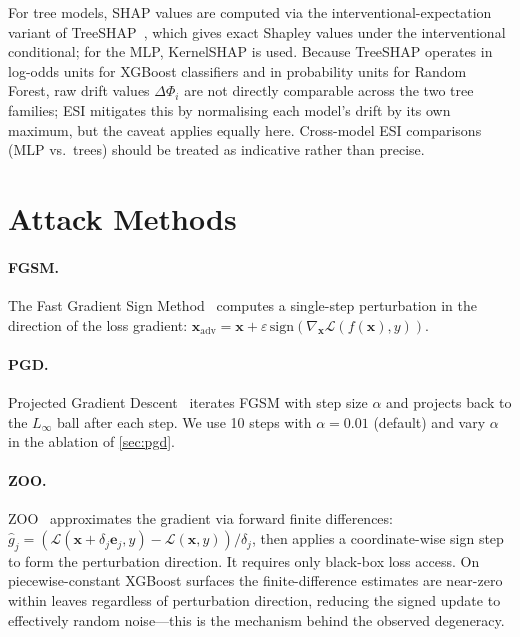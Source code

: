 \documentclass[runningheads]{llncs}
\begin{document}
For tree models, SHAP values are computed via the interventional-expectation
variant of TreeSHAP~\cite{lundberg2020treeshap}, which gives exact Shapley
values under the interventional conditional;
for the MLP, KernelSHAP is used.  Because TreeSHAP operates in log-odds units
for XGBoost classifiers and in probability units for Random Forest, raw drift
values $\Delta\Phi_i$ are not directly comparable across the two tree families;
ESI mitigates this by normalising each model's drift by its own maximum, but the
caveat applies equally here.  Cross-model ESI comparisons (MLP vs.\ trees)
should be treated as indicative rather than precise.

\section{Attack Methods}
\label{sec:attacks}

\paragraph{FGSM.}  The Fast Gradient Sign Method~\cite{goodfellow2015explaining}
computes a single-step perturbation in the direction of the loss gradient:
$\mathbf{x}_{\mathrm{adv}} = \mathbf{x} + \varepsilon\,\mathrm{sign}
(\nabla_\mathbf{x}\mathcal{L}(f(\mathbf{x}), y))$.

\paragraph{PGD.}  Projected Gradient Descent~\cite{madry2018towards} iterates
FGSM with step size $\alpha$ and projects back to the $L_\infty$ ball after each
step.  We use 10 steps with $\alpha=0.01$ (default) and vary $\alpha$ in the
ablation of \cref{sec:pgd}.

\paragraph{ZOO.}  ZOO~\cite{chen2017zoo} approximates the gradient via
forward finite differences:
$\hat{g}_j = (\mathcal{L}(\mathbf{x} + \delta_j \mathbf{e}_j, y)
- \mathcal{L}(\mathbf{x}, y)) / \delta_j$,
then applies a coordinate-wise sign step to form the perturbation direction.
It requires only black-box loss access.  On piecewise-constant XGBoost surfaces
the finite-difference estimates are near-zero within leaves regardless of
perturbation direction, reducing the signed update to effectively random
noise---this is the mechanism behind the observed degeneracy.
\end{document}
